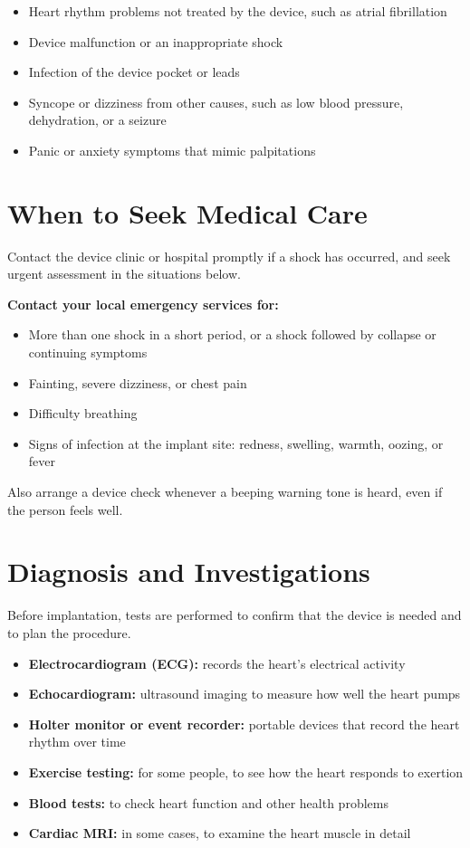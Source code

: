 \begin{itemize}
    \item Heart rhythm problems not treated by the device, such as atrial fibrillation
    \item Device malfunction or an inappropriate shock
    \item Infection of the device pocket or leads
    \item Syncope or dizziness from other causes, such as low blood pressure, dehydration, or a seizure
    \item Panic or anxiety symptoms that mimic palpitations
\end{itemize}

\section*{When to Seek Medical Care}
Contact the device clinic or hospital promptly if a shock has occurred, and seek urgent assessment in the situations below.

\textbf{Contact your local emergency services for:}
\begin{itemize}
    \item More than one shock in a short period, or a shock followed by collapse or continuing symptoms
    \item Fainting, severe dizziness, or chest pain
    \item Difficulty breathing
    \item Signs of infection at the implant site: redness, swelling, warmth, oozing, or fever
\end{itemize}

Also arrange a device check whenever a beeping warning tone is heard, even if the person feels well.

\section*{Diagnosis and Investigations}
Before implantation, tests are performed to confirm that the device is needed and to plan the procedure.

\begin{itemize}
    \item \textbf{Electrocardiogram (ECG):} records the heart's electrical activity
    \item \textbf{Echocardiogram:} ultrasound imaging to measure how well the heart pumps
    \item \textbf{Holter monitor or event recorder:} portable devices that record the heart rhythm over time
    \item \textbf{Exercise testing:} for some people, to see how the heart responds to exertion
    \item \textbf{Blood tests:} to check heart function and other health problems
    \item \textbf{Cardiac MRI:} in some cases, to examine the heart muscle in detail
\end{itemize}

